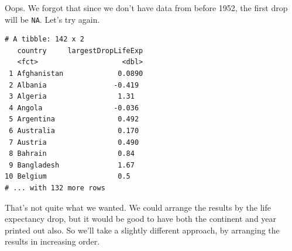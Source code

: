 \documentclass[]{krantz}
\makeatletter
\newenvironment{Shaded}{\begin{snugshade}}{\end{snugshade}}
\newcommand{\DataTypeTok}[1]{\textcolor[rgb]{0.27,0.27,0.27}{#1}}
\newcommand{\KeywordTok}[1]{\textcolor[rgb]{0.27,0.27,0.27}{\textbf{#1}}}
\newcommand{\NormalTok}[1]{#1}
\newcommand{\OperatorTok}[1]{\textcolor[rgb]{0.43,0.43,0.43}{\textbf{#1}}}
\newcommand{\OtherTok}[1]{\textcolor[rgb]{0.37,0.37,0.37}{#1}}
\newcommand{\StringTok}[1]{\textcolor[rgb]{0.5,0.5,0.5}{#1}}
\newenvironment{kframe}{%
\medskip{}
\setlength{\fboxsep}{.8em}
 \def\at@end@of@kframe{}%
 \ifinner\ifhmode%
  \def\at@end@of@kframe{\end{minipage}}%
  \begin{minipage}{\columnwidth}%
 \fi\fi%
 \def\FrameCommand##1{\hskip\@totalleftmargin \hskip-\fboxsep
 \colorbox{shadecolor}{##1}\hskip-\fboxsep
     \hskip-\linewidth \hskip-\@totalleftmargin \hskip\columnwidth}%
 \MakeFramed {\advance\hsize-\width
   \@totalleftmargin\z@ \linewidth\hsize
   \@setminipage}}%
 {\par\unskip\endMakeFramed%
 \at@end@of@kframe}
\renewenvironment{Shaded}{\begin{kframe}}{\end{kframe}}
\makeatother
\begin{document}
Oops. We forgot that since we don't have data from before 1952, the first drop will be \texttt{NA}. Let's try again.

\begin{Shaded}
\end{Shaded}

\begin{verbatim}
# A tibble: 142 x 2
   country     largestDropLifeExp
   <fct>                    <dbl>
 1 Afghanistan             0.0890
 2 Albania                -0.419 
 3 Algeria                 1.31  
 4 Angola                 -0.036 
 5 Argentina               0.492 
 6 Australia               0.170 
 7 Austria                 0.490 
 8 Bahrain                 0.84  
 9 Bangladesh              1.67  
10 Belgium                 0.5   
# ... with 132 more rows
\end{verbatim}

That's not quite what we wanted. We could arrange the results by the life expectancy drop, but it would be good to have both the continent and year printed out also. So we'll take a slightly different approach, by arranging the results in increasing order.

\begin{Shaded}
\end{Shaded}
\end{document}
